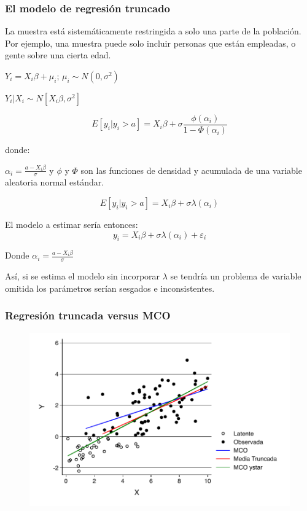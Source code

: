 \begin{frame}[fragile]
	\frametitle{El modelo de regresión truncado}
	
	La muestra está sistemáticamente restringida a solo una parte de
	la población. Por ejemplo, una muestra puede solo incluir personas
	que están empleadas, o gente sobre una cierta edad.
	\bigskip
	\pause
	
	$Y_i=X_i\beta+\mu_i$; $\mu_i \sim N(0,\sigma^2)$ \\
	\medskip
	
	\pause
	
	$Y_i|X_i \sim N[X_i \beta,\sigma^2]$ \\
	\smallskip
	
	\pause
	
	$$E[y_i|y_i>a]=X_i\beta+\sigma\frac{\phi(\alpha_i)}{1-\Phi(\alpha_i)}$$
	\smallskip
	
	donde:
	\medskip
	
	\pause
	$\alpha_i=\frac{a-X_i\beta}{\sigma}$ y $\phi$ y
	$\Phi$ son las funciones de densidad y acumulada de una variable
	aleatoria normal estándar. \\
	\smallskip
	
	\pause
	
	$$E[y_i|y_i>a]=X_i\beta+\sigma\lambda(\alpha_i)$$
	
\end{frame}

\begin{frame}
	El modelo a estimar sería entonces:
	$$y_i=X_i\beta+\sigma \lambda(\alpha_i)+\varepsilon_i$$
	
	Donde $\alpha_i=\frac{a-X_i\beta}{\sigma}$
	
	\bigskip
	
	Así, si se estima el modelo sin incorporar $\lambda$ se tendría un problema de variable omitida los parámetros serían sesgados e inconsistentes.
	
\end{frame}

\begin{frame}
	\frametitle{Regresión truncada versus MCO}
	\begin{figure}
		\centering
		\includegraphics[scale=.75]{fig/truncreg.pdf}
	\end{figure}
\end{frame}


